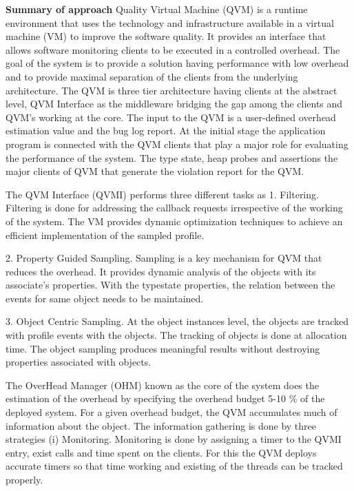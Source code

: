 \begin{compactitem}
\item[\textbf{Summary of approach}] Quality Virtual Machine (QVM) is a runtime environment that uses the technology and infrastructure available in a virtual machine (VM) to improve the software quality. It provides an interface that allows software monitoring clients to be executed in a controlled overhead. The goal of the system is to provide a solution having performance with low overhead and to provide maximal separation of the clients from the underlying architecture. The QVM is three tier architecture having clients at the abstract level, QVM Interface as the middleware bridging the gap among the clients and QVM’s working at the core. The input to the QVM is a user-defined overhead estimation value and the bug log report. At the initial stage the application program is connected with the QVM clients that play a major role for evaluating the performance of the system. The type state, heap probes and assertions the major clients of QVM that generate the violation report for the QVM. 

The QVM Interface (QVMI) performs three different tasks as 
1. Filtering. Filtering is done for addressing the callback requests irrespective of the working of the system. The VM provides dynamic optimization techniques to achieve an efficient implementation of the sampled profile.

2.	Property Guided Sampling. Sampling is a key mechanism for QVM that reduces the overhead. It provides dynamic analysis of the objects with its associate’s properties. With the typestate properties, the relation between the events for same object needs to be maintained.

3.	Object Centric Sampling.     At the object instances level, the objects are tracked with profile events with the objects. The tracking of objects is done at allocation time. The object sampling produces meaningful results without destroying properties associated with objects.

The OverHead Manager (OHM) known as the core of the system does the estimation of the overhead by specifying the overhead budget 5-10 \% of the deployed system. For a given overhead budget, the QVM accumulates much of information about the object. The information gathering is done by three strategies 
(i)	Monitoring. Monitoring is done by assigning a timer to the QVMI entry, exist calls and time spent on the clients. For this the QVM deploys accurate timers so that time working and existing of the threads can be tracked properly.


\end{compactitem}
